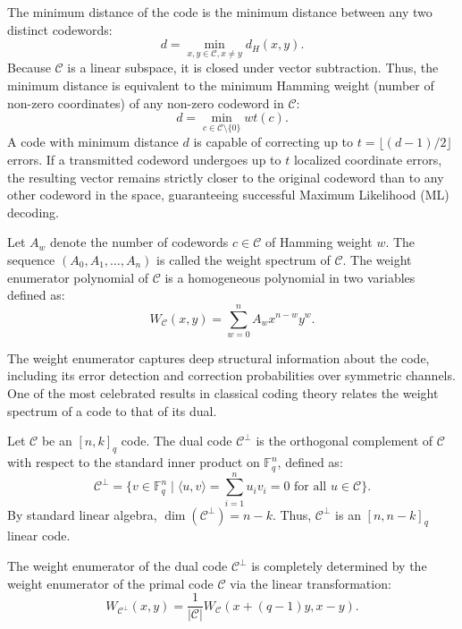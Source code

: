 The minimum distance of the code is the minimum distance between any two distinct codewords:
\[
d = \min_{x, y \in \mathcal{C}, x \neq y} d_H(x, y).
\]
Because $\mathcal{C}$ is a linear subspace, it is closed under vector subtraction. Thus, the minimum distance is equivalent to the minimum Hamming weight (number of non-zero coordinates) of any non-zero codeword in $\mathcal{C}$:
\[
d = \min_{c \in \mathcal{C} \setminus \{0\}} wt(c).
\]
A code with minimum distance $d$ is capable of correcting up to $t = \lfloor (d-1)/2 \rfloor$ errors. If a transmitted codeword undergoes up to $t$ localized coordinate errors, the resulting vector remains strictly closer to the original codeword than to any other codeword in the space, guaranteeing successful Maximum Likelihood (ML) decoding.

\begin{definition}
Let $A_w$ denote the number of codewords $c \in \mathcal{C}$ of Hamming weight $w$. The sequence $(A_0, A_1, \dots, A_n)$ is called the weight spectrum of $\mathcal{C}$. The weight enumerator polynomial of $\mathcal{C}$ is a homogeneous polynomial in two variables defined as:
\[
W_{\mathcal{C}}(x, y) = \sum_{w=0}^n A_w x^{n-w} y^w.
\]
\end{definition}

The weight enumerator captures deep structural information about the code, including its error detection and correction probabilities over symmetric channels. One of the most celebrated results in classical coding theory relates the weight spectrum of a code to that of its dual.

\begin{definition}
Let $\mathcal{C}$ be an $[n, k]_q$ code. The dual code $\mathcal{C}^\perp$ is the orthogonal complement of $\mathcal{C}$ with respect to the standard inner product on $\mathbb{F}_q^n$, defined as:
\[
\mathcal{C}^\perp = \{v \in \mathbb{F}_q^n \mid \langle u, v \rangle = \sum_{i=1}^n u_i v_i = 0 \text{ for all } u \in \mathcal{C}\}.
\]
By standard linear algebra, $\dim(\mathcal{C}^\perp) = n - k$. Thus, $\mathcal{C}^\perp$ is an $[n, n-k]_q$ linear code.
\end{definition}

\begin{theorem}
\label{thm:macwilliams}
The weight enumerator of the dual code $\mathcal{C}^\perp$ is completely determined by the weight enumerator of the primal code $\mathcal{C}$ via the linear transformation:
\[
W_{\mathcal{C}^\perp}(x, y) = \frac{1}{|\mathcal{C}|} W_{\mathcal{C}}(x + (q-1)y, x - y).
\]
\end{theorem}


